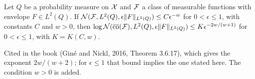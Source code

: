\begin{theorem}
  \label{thm:han-4-12}
  Let $Q$ be a probability measure on $\mathcal{X}$ and $\mathcal{F}$ a class of measurable functions with envelope $F\in L^2(Q)$. If $\mathcal{N}(\mathcal{F},L^2(Q),\epsilon\|F\|_{L^2(Q)})\le C\epsilon^{-w}$ for $0<\epsilon\le1$, with constants $C$ and $w>0$, then $\log\mathcal{N}(\overline{\mathrm{co}}(\mathcal{F}),L^2(Q),\epsilon\|F\|_{L^2(Q)})\le K\epsilon^{-2w/(w+1)}$ for $0<\epsilon\le1$, with $K=K(C,w)$.
\end{theorem}
\begin{remark}
  Cited in the book (Gin\'e and Nickl, 2016, Theorem 3.6.17), which gives the exponent $2w/(w+2)$; for $\epsilon\le1$ that bound implies the one stated here. The condition $w>0$ is added.
\end{remark}
